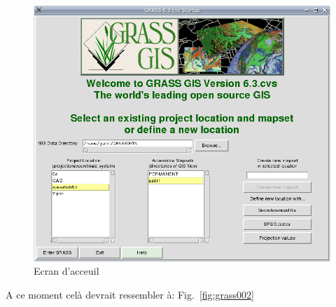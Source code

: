 \begin{figure}[htbp]
   \centering
   \includegraphics[scale=0.3]{grass001.png}
   \caption{Ecran d'acceuil}
   \label{fig:grass001}
\end{figure}

A ce moment cel\`a devrait ressembler \`a: Fig.~\ref{fig:grass002}

